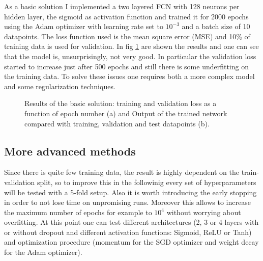\documentclass[a4paper, 11pt]{article}
\begin{document}
    As a basic solution I implemented a two layered FCN with 128 neurons per hidden layer, the sigmoid as activation function and trained it for 2000 epochs using the Adam optimizer with learning rate set to $10^{-3}$ and a batch size of 10 datapoints. The loss function used is the mean square error (MSE) and 10\% of training data is used for validation. In fig \ref{fig:r:basic} are shown the results and one can see that the model is, unsurprisingly, not very good. In particular the validation loss started to increase just after 500 epochs and still there is some underfitting on the training data.
    To solve these issues one requires both a more complex model and some regularization techniques.

    \begin{figure}
      \centering
       \quad
      \caption{Results of the basic solution: training and validation loss as a function of epoch number (a) and Output of the trained network compared with training, validation and test datapoints (b).}
      \label{fig:r:basic}
    \end{figure}

  \subsection{More advanced methods}
    Since there is quite few training data, the result is highly dependent on the train-validation split, so to improve this in the followinig every set of hyperparameters will be tested with a 5-fold setup. Also it is worth introducing the early stopping in order to not lose time on unpromising runs.
    Moreover this allows to increase the maximum number of epochs for example to $10^4$ without worrying about overfitting.
    At this point one can test different architectures (2, 3 or 4 layers with or without dropout and different activation functions: Sigmoid, ReLU or Tanh) and optimization procedure (momentum for the SGD optimizer and weight decay for the Adam optimizer).
\end{document}
